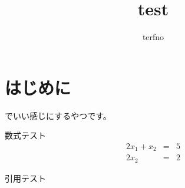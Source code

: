 \documentclass[a4paper]{article}
\begin{document}
  \title{test}
  \author{terfno}
  \maketitle

  \section{はじめに}
  {\XeTeX} でいい感じにするやつです。

  数式テスト
  \begin{eqnarray}
    2x_1 + x_2 & = & 5 \nonumber \\
    2x_2 & = & 2 \nonumber
  \end{eqnarray}

  引用テスト\cite{lecun2015deep}

  
  
\end{document}
